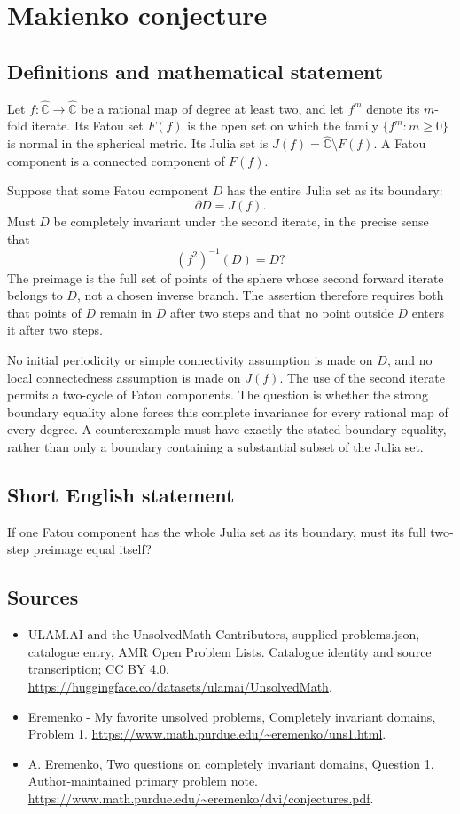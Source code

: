 \documentclass[11pt,a4paper]{article}
\begin{document}
\section*{Makienko conjecture}\label{statement}

\subsection{Definitions and mathematical statement}
Let $f:\widehat{\mathbb C}\to\widehat{\mathbb C}$ be a rational
map of degree at least two, and let $f^m$ denote its $m$-fold
iterate. Its Fatou set $F(f)$ is the open set on which the
family $\{f^m:m\geq0\}$ is normal in the spherical metric.
Its Julia set is $J(f)=\widehat{\mathbb C}\setminus F(f)$.
A Fatou component is a connected component of $F(f)$.

Suppose that some Fatou component $D$ has the entire Julia
set as its boundary:
\[
                    \partial D=J(f).
\]
Must $D$ be completely invariant under the second iterate,
in the precise sense that
\[
 (f^2)^{-1}(D)=D?
\]
The preimage is the full set of points of the sphere whose
second forward iterate belongs to $D$, not a chosen inverse
branch. The assertion therefore requires both that points
of $D$ remain in $D$ after two steps and that no point
outside $D$ enters it after two steps.

No initial periodicity or simple connectivity assumption is
made on $D$, and no local connectedness assumption is made
on $J(f)$. The use of the second iterate permits a two-cycle
of Fatou components. The question is whether the strong
boundary equality alone forces this complete invariance for
every rational map of every degree. A counterexample must
have exactly the stated boundary equality, rather than only
a boundary containing a substantial subset of the Julia set.
\subsection{Short English statement}
If one Fatou component has the whole Julia set as its boundary, must its full two-step preimage equal itself?
\subsection{Sources}
\begin{itemize}
\item[S1] ULAM.AI and the UnsolvedMath Contributors, supplied problems.json, catalogue entry, AMR Open Problem Lists. Catalogue identity and source transcription; CC BY 4.0.
\url{https://huggingface.co/datasets/ulamai/UnsolvedMath}.
\item[S2] Eremenko - My favorite unsolved problems, Completely invariant domains, Problem 1. 
\url{https://www.math.purdue.edu/~eremenko/uns1.html}.
\item[S3] A. Eremenko, Two questions on completely invariant domains, Question 1. Author-maintained primary problem note.
\url{https://www.math.purdue.edu/~eremenko/dvi/conjectures.pdf}.
\end{itemize}
\end{document}

